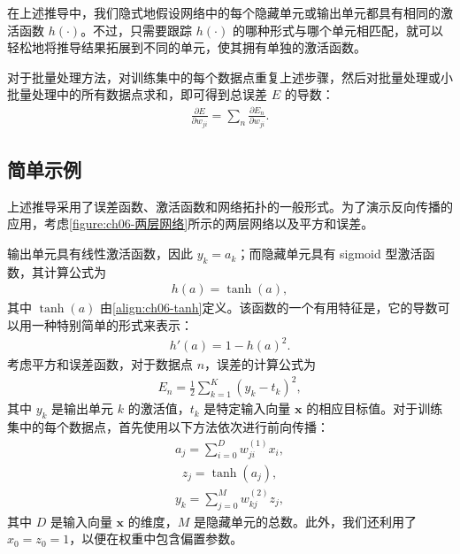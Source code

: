 \documentclass[../../main.tex]{subfiles}
\begin{document}
在上述推导中，我们隐式地假设网络中的每个隐藏单元或输出单元都具有相同的激活函数 $h(\cdot)$。不过，只需要跟踪 $h(\cdot)$ 的哪种形式与哪个单元相匹配，就可以轻松地将推导结果拓展到不同的单元，使其拥有单独的激活函数。

对于批量处理方法，对训练集中的每个数据点重复上述步骤，然后对批量处理或小批量处理中的所有数据点求和，即可得到总误差 $E$ 的导数：
\begin{align}
\frac{\partial E}{\partial w_{ji}}=\sum_{n}\frac{\partial E_n}{\partial w_{ji}}.
\label{align:ch08-批量梯度}
\end{align}

\subsection{简单示例}\label{subsection:ch08-简单示例}

上述推导采用了误差函数、激活函数和网络拓扑的一般形式。为了演示反向传播的应用，考虑\cref{figure:ch06-两层网络}所示的两层网络以及平方和误差。

\begin{example}[ 两层网络的误差反向传播]\label{example:ch08-两层网络}
输出单元具有线性激活函数，因此 $y_k=a_k$；而隐藏单元具有 sigmoid 型激活函数，其计算公式为
\begin{align}
h(a)=\tanh(a),
\label{align:ch08-tanh}
\end{align}
其中 $\tanh(a)$ 由\eqref{align:ch06-tanh}定义。该函数的一个有用特征是，它的导数可以用一种特别简单的形式来表示：
\begin{align}
h'(a)=1-h(a)^{2}.
\label{align:ch08-tanh导数}
\end{align}
考虑平方和误差函数，对于数据点 $n$，误差的计算公式为
\begin{align}
E_n=\frac{1}{2}\sum_{k=1}^{K}\left(y_k-t_k\right)^{2},
\label{align:ch08-示例误差}
\end{align}
其中 $y_k$ 是输出单元 $k$ 的激活值，$t_k$ 是特定输入向量 $\mathbf{x}$ 的相应目标值。对于训练集中的每个数据点，首先使用以下方法依次进行前向传播：
\begin{align}
a_j=\sum_{i=0}^{D}w_{ji}^{(1)}x_i,
\label{align:ch08-示例前向1}
\end{align}
\begin{align}
z_j=\tanh(a_j),
\label{align:ch08-示例前向2}
\end{align}
\begin{align}
y_k=\sum_{j=0}^{M}w_{kj}^{(2)}z_j,
\label{align:ch08-示例前向3}
\end{align}
其中 $D$ 是输入向量 $\mathbf{x}$ 的维度，$M$ 是隐藏单元的总数。此外，我们还利用了 $x_0=z_0=1$，以便在权重中包含偏置参数。
\end{example}
\end{document}
